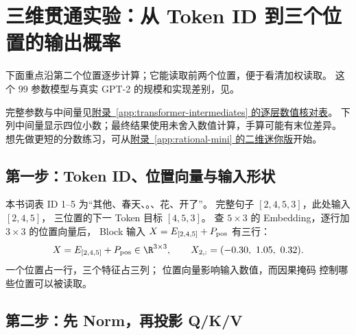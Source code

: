 \chapterrule
\section{三维贯通实验：从 Token ID 到三个位置的输出概率}
\label{intro:22b-token-to-output}
下面重点沿第二个位置逐步计算；它能读取前两个位置，便于看清加权读取。
这个 $99$ 参数模型与真实 GPT-2 的规模和实现差别，见。

完整参数与中间量见\hyperref[app:transformer-intermediates]{附录~\ref*{app:transformer-intermediates} 的逐层数值核对表}。
下列中间量显示四位小数；最终结果使用未舍入数值计算，手算可能有末位差异。
想先做更短的分数练习，可从\hyperref[app:rational-mini]{附录~\ref*{app:rational-mini} 的二维迷你版}开始。
\par\smallskip


\subsection{第一步：Token ID、位置向量与输入形状}

本书词表 ID 1--5 为“其他、春天、。、花、开了”。
完整句子 $[2,4,5,3]$，此处输入 $[2,4,5]$，
三位置的下一 Token 目标 $[4,5,3]$。
查 $5\times3$ 的 Embedding，逐行加 $3\times3$ 的位置向量后，
Block 输入 $X=E_{[2,4,5]}+P_{\rm pos}$ 有三行：
\begin{equation}
X=E_{[2,4,5]}+P_{\rm pos}\in\R^{3\times3},
\qquad X_{2,:}=(-0.30,\ 1.05,\ 0.32).
\label{eq:running-three-token-x}
\end{equation}
一个位置占一行，三个特征占三列；
位置向量影响输入数值，而因果掩码 控制哪些位置可以被读取。

\subsection{第二步：先 Norm，再投影 Q/K/V}

